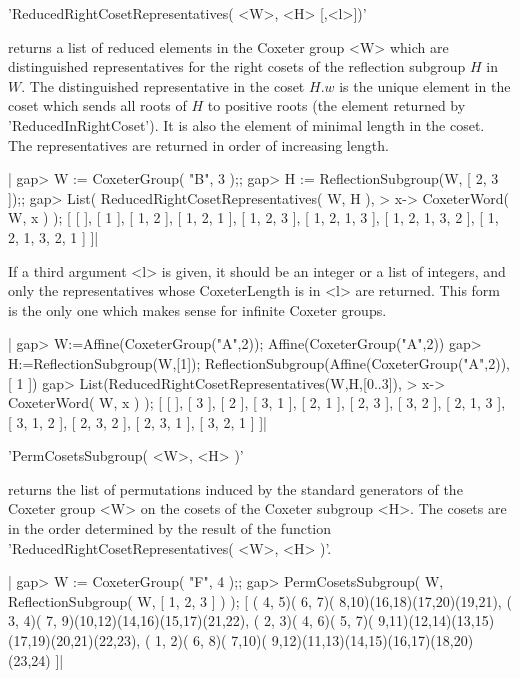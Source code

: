 'ReducedRightCosetRepresentatives( <W>, <H> [,<l>])'

returns a  list of reduced elements  in the Coxeter group  <W> which are
distinguished  representatives for  the right  cosets of  the reflection
subgroup $H$ in $W$. The distinguished representative in the coset $H.w$
is the  unique element  in the  coset which  sends all  roots of  $H$ to
positive roots  (the element  returned by 'ReducedInRightCoset').  It is
also the element of minimal length in the coset. The representatives are
returned in order of increasing length.

|    gap> W := CoxeterGroup( "B", 3 );;
    gap> H := ReflectionSubgroup(W, [ 2, 3 ]);;
    gap> List( ReducedRightCosetRepresentatives( W, H ),
    >                                x-> CoxeterWord( W, x ) );
    [ [  ], [ 1 ], [ 1, 2 ], [ 1, 2, 1 ], [ 1, 2, 3 ], [ 1, 2, 1, 3 ],
      [ 1, 2, 1, 3, 2 ], [ 1, 2, 1, 3, 2, 1 ] ]|

If  a third argument  <l> is given,  it should be  an integer or  a list of
integers,  and only the  representatives whose CoxeterLength  is in <l> are
returned.  This form is the only one which makes sense for infinite Coxeter
groups.

|    gap> W:=Affine(CoxeterGroup("A",2));
    Affine(CoxeterGroup("A",2))
    gap> H:=ReflectionSubgroup(W,[1]);
    ReflectionSubgroup(Affine(CoxeterGroup("A",2)), [ 1 ])
    gap> List(ReducedRightCosetRepresentatives(W,H,[0..3]),
    >                                x-> CoxeterWord( W, x ) );
    [ [  ], [ 3 ], [ 2 ], [ 3, 1 ], [ 2, 1 ], [ 2, 3 ], [ 3, 2 ],
      [ 2, 1, 3 ], [ 3, 1, 2 ], [ 2, 3, 2 ], [ 2, 3, 1 ], [ 3, 2, 1 ] ]|


'PermCosetsSubgroup( <W>, <H> )'

returns the  list of permutations induced  by  the standard generators of
the Coxeter  group <W> on  the cosets of the Coxeter  subgroup  <H>.  The
cosets  are  in the   order determined by   the  result of   the function
'ReducedRightCosetRepresentatives( <W>, <H> )'.

|    gap> W := CoxeterGroup( "F", 4 );;
    gap> PermCosetsSubgroup( W, ReflectionSubgroup( W, [ 1, 2, 3 ] ) );
    [ ( 4, 5)( 6, 7)( 8,10)(16,18)(17,20)(19,21),
      ( 3, 4)( 7, 9)(10,12)(14,16)(15,17)(21,22),
      ( 2, 3)( 4, 6)( 5, 7)( 9,11)(12,14)(13,15)(17,19)(20,21)(22,23),
      ( 1, 2)( 6, 8)( 7,10)( 9,12)(11,13)(14,15)(16,17)(18,20)(23,24) ]|

